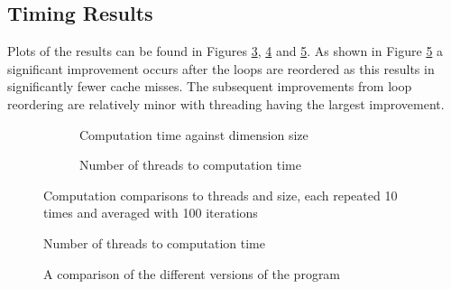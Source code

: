 \documentclass[12pt]{article}
\begin{document}
\subsection{Timing Results}
Plots of the results can be found in Figures \ref{fig:speed}, \ref{fig:speed2} and \ref{fig:comp}. As shown in Figure \ref{fig:comp}
a significant improvement occurs after the loops are reordered as this results in significantly fewer cache misses. The subsequent
improvements from loop reordering are relatively minor with threading having the largest improvement.

\begin{figure}
\end{figure}
\begin{figure}
    \centering
    \begin{subfigure}[b]{0.45\textwidth}
        \begin{adjustbox}{width=\textwidth}
        
        \end{adjustbox}
        \caption{Computation time against dimension size}
        \label{fig:st}
    \end{subfigure}
    \begin{subfigure}[b]{0.45\textwidth}
        \begin{adjustbox}{width=\textwidth}
        
        \end{adjustbox}
        \caption{Number of threads to computation time}
        \label{fig:tt}
    \end{subfigure}
    \caption{Computation comparisons to threads and size, each repeated 10 times and averaged with 100 iterations}
    \label{fig:speed}
\end{figure}


\begin{figure}[H]
    \centering
    \begin{adjustbox}{width=0.6\textwidth}
    
    \end{adjustbox}
    \caption{Number of threads to computation time}
    \label{fig:speed2}
\end{figure}

\begin{figure}
    \centering
    \begin{adjustbox}{width=0.6\textwidth}
    
    \end{adjustbox}
    \caption{A comparison of the different versions of the program}
    \label{fig:comp}
\end{figure}
\end{document}
